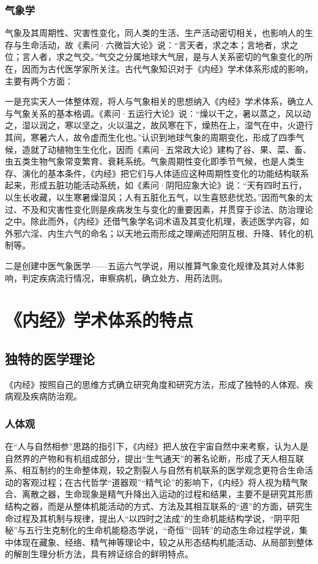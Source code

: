 \documentclass[draft,12pt]{ctexbook}
\begin{document}
\subsubsection{气象学}%

气象及其周期性、灾害性变化，同人类的生活、生产活动密切相关，也影响人的生存与生命活动，故《素问·六微旨大论》说：“言天者，求之本；言地者，求之位；言人者，求之气交。”气交之分属地球大气层，是与人关系密切的气象变化的所在，因而为古代医学家所关注。古代气象知识对于《内经》学术体系形成的影响，主要有两个方面：

一是充实天人一体整体观，将人与气象相关的思想纳入《内经》学术体系，确立人与气象关系的基本格调。《素问·五运行大论》说：“燥以干之，暑以蒸之，风以动之，湿以润之，寒以坚之，火以温之，故风寒在下，燥热在上，湿气在中，火遊行其间，寒暑六人，故令虚而生化也。”认识到地球气象的周期变化，形成了四季气候，造就了动植物生生化化，因而《素问·五常政大论》建构了谷、果、菜、畜、虫五类生物气象常变繁育、衰耗系统。气象周期性变化即季节气候，也是人类生存、演化的基本条件，《内经》把它们与人体适应这种周期性变化的功能结构联系起来，形成五脏功能活动系统，如《素问·阴阳应象大论》说：“天有四时五行，以生长收藏，以生寒暑燥湿风；人有五脏化五气，以生喜怒悲忧恐。”因而气象的太过、不及和灾害性变化则是疾病发生与变化的重要因素，并贯穿于诊法、防治理论之中。除此而外，《内经》还借气象学名词术语及其变化机理，表述医学内容，如外邪六淫、内生六气的命名；以天地云雨形成之理阐述阳阴互根、升降、转化的机制等。

二是创建中医气象医学——五运六气学说，用以推算气象变化规律及其对人体影响，判定疾病流行情况，审察病机，确立处方、用药法则。

\section{《内经》学术体系的特点} %

\subsection{独特的医学理论} %

《内经》按照自己的思维方式确立研究角度和研究方法，形成了独特的人体观、疾病观及疾病防治观。

\subsubsection{人体观}%

在“人与自然相参”思路的指引下，《内经》把人放在宇宙自然中来考察，认为人是自然界的产物和有机组成部分，提出“生气通天”的著名论断，形成了天人相互联系、相互制约的生命整体观，较之割裂人与自然有机联系的医学观念更符合生命活动的客观过程；在古代哲学“道器观”“精气论”的影响下，《内经》将人视为精气聚合、离散之器，生命现象是精气升降出入运动的过程和结果，主要不是研究其形质结构之器，而是从整体机能活动的方式、方法及其相互联系的“道”的方面，研究生命过程及其机制与规律，提出人“以四时之法成”的生命机能结构学说，“阴平阳秘”与五行生克制化的生命机能稳态学说，“奇恒”“回转”的动态生命过程学说，集中体现在藏象、经络、精气神等理论中，较之从形态结构机能活动、从局部到整体的解剖生理分析方法，具有辨证综合的鲜明特点。
\end{document}
